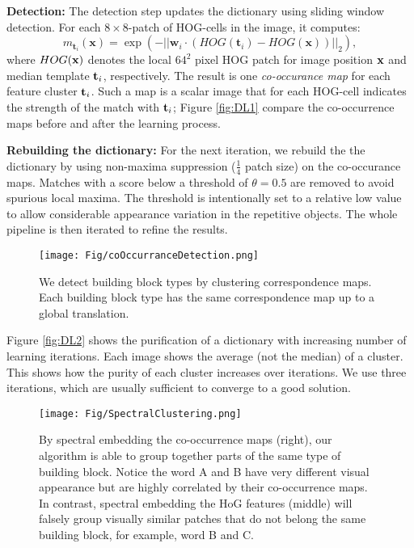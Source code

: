 \documentclass{acmtog}
\begin{document}
\textbf{Detection:} The detection step updates the dictionary using sliding window detection. For each $8\times 8$-patch of HOG-cells in the image, it computes:
%
\begin{equation}
m_{\textbf{t}_i}(\textbf{x}) = \exp\left(-||\textbf{w}_i\cdot(HOG(\textbf{t}_i) - HOG(\textbf{x}))||_2 \right),
\label{eq:finalMatching}
\end{equation}
%
where $HOG(\mathbf{x})$ denotes the local $64^2$ pixel HOG patch for image position $\mathbf{x}$ and median template $\mathbf{t}_i$, respectively. The result is one \emph{co-occurance map} for each feature cluster $\mathbf{t}_i$. Such a map is a scalar image that for each HOG-cell indicates the strength of the match with $\mathbf{t}_i$; Figure \ref{fig:DL1} compare the co-occurrence maps before and after the learning process.

\textbf{Rebuilding the dictionary:} For the next iteration, we rebuild the the dictionary by using non-maxima suppression ($\frac{1}{4}$ patch size) on the co-occurance maps. Matches with a score below a threshold of $\theta = 0.5$ are removed to avoid spurious local maxima. The threshold is intentionally set to a relative low value to allow considerable appearance variation in the repetitive objects. The whole pipeline is then iterated to refine the results. 

\begin{figure}
	\centering
		\texttt{[image: Fig/coOccurranceDetection.png]}
	\caption{We detect building block types by clustering correspondence maps. Each building block type has the same correspondence map up to a global translation.}
	\label{fig:coOccurranceDetection}
\end{figure}

Figure \ref{fig:DL2} shows the purification of a dictionary with increasing number of learning iterations. Each image shows the average (not the median) of a cluster. This shows how the purity of each cluster increases over iterations. We use three iterations, which are usually sufficient to converge to a good solution.

\begin{figure*}[t!]
  \centering
  \texttt{[image: Fig/SpectralClustering.png]}
  \caption{By spectral embedding the co-occurrence maps (right), our algorithm is able to group together parts of the same type of building block. Notice the word A and B have very different visual appearance but are highly correlated by their co-occurrence maps. In contrast, spectral embedding the HoG features (middle) will falsely group visually similar patches that do not belong the same building block, for example, word B and C.} 
	\label{fig:SpectralClustering}
\end{figure*}
\end{document}
